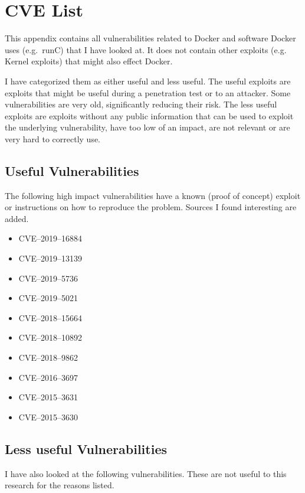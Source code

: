 \chapter{CVE List}\label{appendix:CVE-List}

This appendix contains all vulnerabilities related to Docker and software Docker uses (e.g.\ runC) that I have looked at. It does not contain other exploits (e.g. Kernel exploits) that might also effect Docker.

I have categorized them as either useful and less useful. The useful exploits are exploits that might be useful during a penetration test or to an attacker. Some vulnerabilities are very old, significantly reducing their risk. The less useful exploits are exploits without any public information that can be used to exploit the underlying vulnerability, have too low of an impact, are not relevant or are very hard to correctly use.

\section{Useful Vulnerabilities}
The following high impact vulnerabilities have a known (proof of concept) exploit or instructions on how to reproduce the problem. Sources I found interesting are added.

\begin{itemize}
    \item CVE--2019--16884\cite{CVE-2019-16884-Github}
    \item CVE--2019--13139\cite{CVE-2019-13139-STAALDRAAD}
    \item CVE--2019--5736\cite{CVE-2019-5736-DragonSector}\cite{CVE-2019-5736-Github}\cite{CVE-2019-5736-Twistlock}
    \item CVE--2019--5021\cite{CVE-2019-5021-Talos}
    \item CVE--2018--15664\cite{CVE-2018-15664-Openwall}\cite{CVE-2018-15664-Bugzilla}
    \item CVE--2018--10892\cite{CVE-2018-10892-Github}
    \item CVE--2018--9862\cite{CVE-2018-9862-Github}
    \item CVE--2016--3697\cite{CVE-2016-3697-Github}
    \item CVE--2015--3631\cite{CVE-2015-363-Seclists}
    \item CVE--2015--3630\cite{CVE-2015-363-Seclists}
\end{itemize}

\section{Less useful Vulnerabilities}
I have also looked at the following vulnerabilities. These are not useful to this research for the reasons listed.

